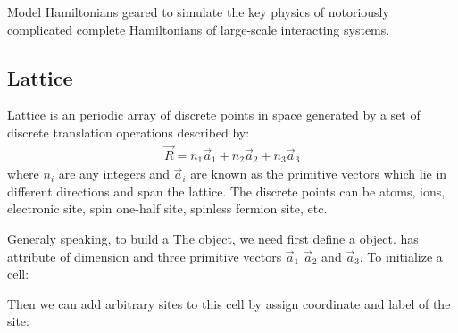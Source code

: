 \documentclass[letterpaper,10pt,english]{sphinxmanual}
\begin{document}
Model Hamiltonians geared to simulate the key physics of notoriously complicated
complete Hamiltonians of large-scale interacting systems.


\subsection{Lattice}
\label{\detokenize{user_model_system:lattice}}
Lattice is an periodic array of discrete points in space generated by a set of
discrete translation operations described by:
\begin{equation*}
\begin{split}\vec{R} = n_1\vec{a}_1 + n_2\vec{a}_2 + n_3\vec{a}_3\end{split}
\end{equation*}
where \(n_i\) are any integers and \(\vec{a}_i\) are known as the primitive
vectors which lie in different directions and span the lattice. The discrete points
can be atoms, ions, electronic site, spin one-half site, spinless fermion site, etc.

Generaly speaking, to build a The  object, we need first define a
 object.  has attribute of dimension and three primitive
vectors \(\vec{a}_1\) \(\vec{a}_2\) and \(\vec{a}_3\). To initialize a
cell:

%
\begin{sphinxVerbatim}[commandchars=\\\{\}]
  \PYG{p}{[}\PYG{p}{]}\PYG{p}{[}\PYG{p}{]}\PYG{p}{[}\PYG{p}{]}
\end{sphinxVerbatim}

Then we can add arbitrary sites to this cell by assign coordinate and label of the
site:

%
\begin{sphinxVerbatim}[commandchars=\\\{\}]
\PYG{p}{[}\PYG{p}{]}
\end{sphinxVerbatim}
\end{document}
